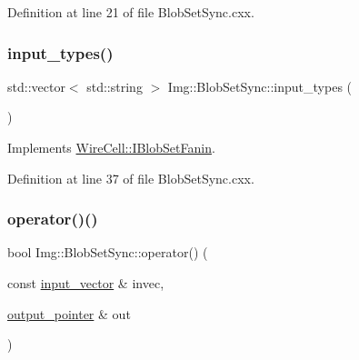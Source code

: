 Definition at line 21 of file Blob\+Set\+Sync.\+cxx.

\mbox{\label{class_wire_cell_1_1_img_1_1_blob_set_sync_aa32d9014596aec6bcbdcd8ed027a95ad}} 
\subsubsection{\texorpdfstring{input\+\_\+types()}{input\_types()}}
{\footnotesize\ttfamily std\+::vector$<$ std\+::string $>$ Img\+::\+Blob\+Set\+Sync\+::input\+\_\+types (\begin{DoxyParamCaption}{ }\end{DoxyParamCaption})\hspace{0.3cm}{\ttfamily [virtual]}}



Implements \hyperlink{class_wire_cell_1_1_i_blob_set_fanin_a1783b57125c4b9df55a828ec832dbb72}{Wire\+Cell\+::\+I\+Blob\+Set\+Fanin}.



Definition at line 37 of file Blob\+Set\+Sync.\+cxx.

\mbox{\label{class_wire_cell_1_1_img_1_1_blob_set_sync_a536fca2a18e1bf4b44e5aad6f8b39ded}} 
\subsubsection{\texorpdfstring{operator()()}{operator()()}}
{\footnotesize\ttfamily bool Img\+::\+Blob\+Set\+Sync\+::operator() (\begin{DoxyParamCaption}\item[{const \hyperlink{class_wire_cell_1_1_i_fanin_node_aec26233b8b7756c5a42280a5db47ffda}{input\+\_\+vector} \&}]{invec,  }\item[{\hyperlink{class_wire_cell_1_1_i_fanin_node_a748d9cd1916dda1cb12c3376b229f906}{output\+\_\+pointer} \&}]{out }\end{DoxyParamCaption})\hspace{0.3cm}{\ttfamily [virtual]}}



